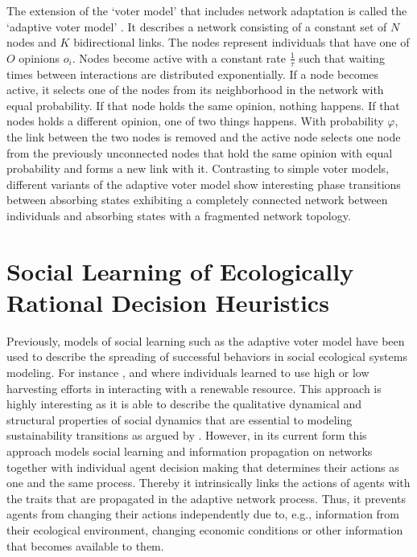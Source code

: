 The extension of the `voter model' that includes network adaptation is called the `adaptive voter model' \citep{Holme2006a, Bohme2011, Rogers2013, Klamser2016, Min2017}. It describes a network consisting of a constant set of $N$ nodes and $K$ bidirectional links. The nodes represent individuals that have one of $O$ opinions $o_i$. Nodes become active with a constant rate $\frac{1}{\tau}$ such that waiting times between interactions are distributed exponentially. If a node becomes active, it selects one of the nodes from its neighborhood in the network with equal probability. If that node holds the same opinion, nothing happens. If that nodes holds a different opinion, one of two things happens. With probability $\varphi$, the link between the two nodes is removed and the active node selects one node from the previously unconnected nodes that hold the same opinion with equal probability and forms a new link with it.
Contrasting to simple voter models, different variants of the adaptive voter model show interesting phase transitions between absorbing states exhibiting a completely connected network between individuals and absorbing states with a fragmented network topology.

\section{Social Learning of Ecologically Rational Decision Heuristics}
\label{sec:intro_learning_heuristics}

Previously, models of social learning such as the adaptive voter model have been used to describe the spreading of successful behaviors in social ecological systems modeling. For instance \cite{Wiedermann2015}, \cite{Barfuss2017} and \cite{Geier2019} where individuals learned to use high or low harvesting efforts in interacting with a renewable resource. This approach is highly interesting as it is able to describe the qualitative dynamical and structural properties of social dynamics that are essential to modeling sustainability transitions as argued by \cite{Lade2017}.
However, in its current form this approach models social learning and information propagation on networks together with individual agent decision making that determines their actions as one and the same process. Thereby it intrinsically links the actions of agents with the traits that are propagated in the adaptive network process. Thus, it prevents agents from changing their actions independently due to, e.g., information from their ecological environment, changing economic conditions or other information that becomes available to them. 

